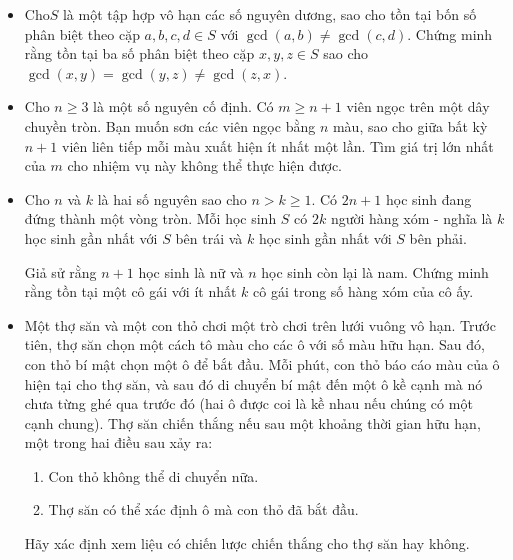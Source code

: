 \documentclass[11pt]{scrartcl}
\begin{document}
\begin{itemize}[label=, leftmargin=0em, itemsep=0.5em]
    \item \begin{btvn}
        Cho$S$ là một tập hợp vô hạn các số nguyên dương, sao cho tồn tại bốn số phân biệt theo cặp $a,b,c,d \in S$ với $\gcd(a,b) \neq \gcd(c,d)$. Chứng minh rằng tồn tại ba số phân biệt theo cặp $x,y,z \in S$ sao cho $\gcd(x,y)=\gcd(y,z) \neq \gcd(z,x)$.
    \end{btvn}

    \item \begin{btvn}
        Cho $n\ge 3$ là một số nguyên cố định. Có $m\ge n+1$ viên ngọc trên một dây chuyền tròn. Bạn muốn sơn các viên ngọc bằng $n$ màu, sao cho giữa bất kỳ $n+1$ viên liên tiếp mỗi màu xuất hiện ít nhất một lần. Tìm giá trị lớn nhất của $m$ cho nhiệm vụ này không thể thực hiện được.

    \end{btvn}


    \item \begin{btvn}
        Cho $n$ và $k$ là hai số nguyên sao cho $n>k\geqslant 1$. Có $2n+1$ học sinh đang đứng thành một vòng tròn. Mỗi học sinh $S$ có $2k$ người hàng xóm - nghĩa là $k$ học sinh gần nhất với $S$ bên trái và $k$ học sinh gần nhất với $S$ bên phải.

        Giả sử rằng $n+1$ học sinh là nữ và $n$ học sinh còn lại là nam. Chứng minh rằng tồn tại một cô gái với ít nhất $k$ cô gái trong số hàng xóm của cô ấy.
    \end{btvn}

    \item \begin{btvn}
        Một thợ săn và một con thỏ chơi một trò chơi trên lưới vuông vô hạn. Trước tiên, thợ săn chọn một cách tô màu cho các ô với số màu hữu hạn. Sau đó, con thỏ bí mật chọn một ô để bắt đầu. Mỗi phút, con thỏ báo cáo màu của ô hiện tại cho thợ săn, và sau đó di chuyển bí mật đến một ô kề cạnh mà nó chưa từng ghé qua trước đó (hai ô được coi là kề nhau nếu chúng có một cạnh chung). Thợ săn chiến thắng nếu sau một khoảng thời gian hữu hạn, một trong hai điều sau xảy ra:
        \begin{enumerate}
            \item Con thỏ không thể di chuyển nữa.
            \item Thợ săn có thể xác định ô mà con thỏ đã bắt đầu.
        \end{enumerate}
        Hãy xác định xem liệu có chiến lược chiến thắng cho thợ săn hay không.
    \end{btvn}




\end{itemize}
\end{document}

